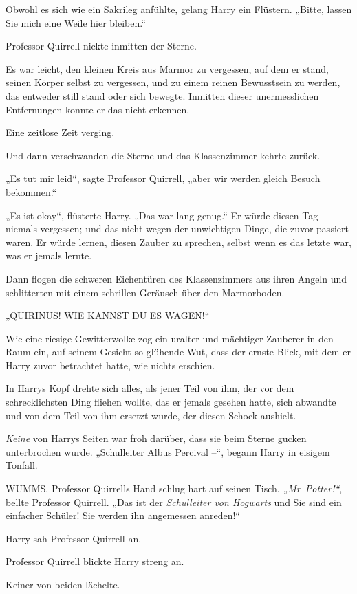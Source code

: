 {Obwohl es sich wie ein Sakrileg anfühlte, gelang Harry ein Flüstern. „Bitte, lassen Sie mich eine Weile hier bleiben.“

Professor Quirrell nickte inmitten der Sterne.

Es war leicht, den kleinen Kreis aus Marmor zu vergessen, auf dem er stand, seinen Körper selbst zu vergessen, und zu einem reinen Bewusstsein zu werden, das entweder still stand oder sich bewegte. Inmitten dieser unermesslichen Entfernungen konnte er das nicht erkennen.

Eine zeitlose Zeit verging.

Und dann verschwanden die Sterne und das Klassenzimmer kehrte zurück.

„Es tut mir leid“, sagte Professor Quirrell, „aber wir werden gleich Besuch bekommen.“

„Es ist okay“, flüsterte Harry. „Das war lang genug.“ Er würde diesen Tag niemals vergessen; und das nicht wegen der unwichtigen Dinge, die zuvor passiert waren. Er würde lernen, diesen Zauber zu sprechen, selbst wenn es das letzte war, was er jemals lernte.

Dann flogen die schweren Eichentüren des Klassenzimmers aus ihren Angeln und schlitterten mit einem schrillen Geräusch über den Marmorboden.

„QUIRINUS! WIE KANNST DU ES WAGEN!“

Wie eine riesige Gewitterwolke zog ein uralter und mächtiger Zauberer in den Raum ein, auf seinem Gesicht so glühende Wut, dass der ernste Blick, mit dem er Harry zuvor betrachtet hatte, wie nichts erschien.

In Harrys Kopf drehte sich alles, als jener Teil von ihm, der vor dem schrecklichsten Ding fliehen wollte, das er jemals gesehen hatte, sich abwandte und von dem Teil von ihm ersetzt wurde, der diesen Schock aushielt.

\emph{Keine} von Harrys Seiten war froh darüber, dass sie beim Sterne gucken unterbrochen wurde. „Schulleiter Albus Percival --“, begann Harry in eisigem Tonfall.

WUMMS. Professor Quirrells Hand schlug hart auf seinen Tisch. \emph{„Mr~Potter!“}, bellte Professor Quirrell. „Das ist der \emph{Schulleiter von Hogwarts} und Sie sind ein einfacher Schüler! Sie werden ihn angemessen anreden!“

Harry sah Professor Quirrell an.

Professor Quirrell blickte Harry streng an.

Keiner von beiden lächelte.

}
